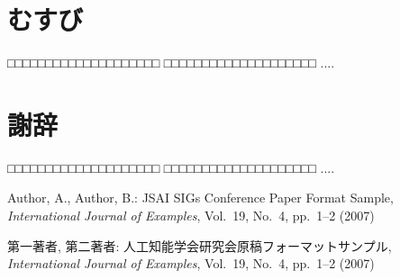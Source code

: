 \documentclass[a4j]{jarticle}
\begin{document}
\section{むすび}
□□□□□□□□□□□□□□□□□□□□
□□□□□□□□□□□□□□□□□□□□
....


\section*{謝辞}

□□□□□□□□□□□□□□□□□□□□
□□□□□□□□□□□□□□□□□□□□
....


\begin{thebibliography}{99}

Author, A., Author, B.:
JSAI SIGs Conference Paper Format Sample,
{\it International Journal of Examples}, Vol.~19, No.~4, pp.~1--2 (2007)

第一著者, 第二著者:
人工知能学会研究会原稿フォーマットサンプル,
{\it International Journal of Examples}, Vol.~19, No.~4, pp.~1--2 (2007)

\end{thebibliography}
\end{document}
